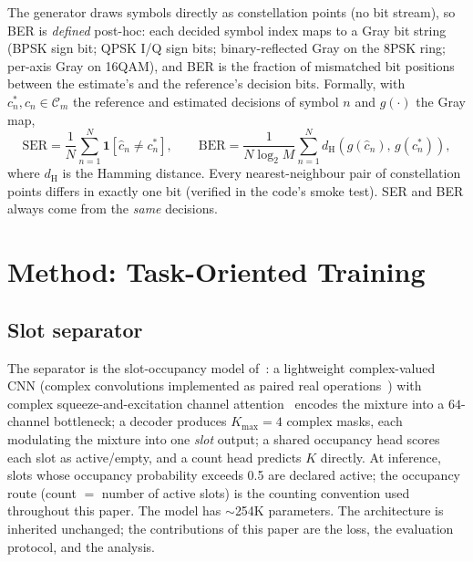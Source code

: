 \documentclass[review,12pt]{elsarticle}
\begin{document}
The generator draws symbols directly as constellation points (no bit
stream), so BER is \emph{defined} post-hoc: each decided symbol index
maps to a Gray bit string (BPSK sign bit; QPSK I/Q sign bits;
binary-reflected Gray on the 8PSK ring; per-axis Gray on 16QAM), and
BER is the fraction of mismatched bit positions between the estimate's
and the reference's decision bits. Formally, with
$c_n^{*}, \hat{c}_n \in \mathcal{C}_m$ the reference and estimated
decisions of symbol $n$ and $g(\cdot)$ the Gray map,
\begin{equation}
  \mathrm{SER} = \frac{1}{N} \sum_{n=1}^{N}
  \mathbf{1}\!\left[\hat{c}_n \neq c_n^{*}\right],
  \qquad
  \mathrm{BER} = \frac{1}{N \log_2 M} \sum_{n=1}^{N}
  d_{\mathrm{H}}\!\left(g(\hat{c}_n),\, g(c_n^{*})\right),
  \label{eq:serber}
\end{equation}
where $d_{\mathrm{H}}$ is the Hamming distance.
Every nearest-neighbour pair of
constellation points differs in exactly one bit (verified in the code's
smoke test). SER and BER always come from the \emph{same} decisions.

\section{Method: Task-Oriented Training}
\label{sec:method}

\subsection{Slot separator}
\label{sec:arch}

The separator is the slot-occupancy model of~\cite{nong2026openworld}:
a lightweight complex-valued CNN (complex convolutions implemented as
paired real operations~\cite{trabelsi2018complex}) with complex
squeeze-and-excitation channel attention~\cite{hu2018senet} encodes the
mixture into a $64$-channel bottleneck; a decoder produces $K_{\max}=4$
complex masks, each modulating the mixture into one \emph{slot} output;
a shared occupancy head scores each slot as active/empty, and a count
head predicts $K$ directly. At inference, slots whose occupancy
probability exceeds 0.5 are declared active; the occupancy route (count
$=$ number of active slots) is the counting convention used throughout
this paper. The model has $\sim$254K parameters. The architecture is
inherited unchanged; the contributions of this paper are the loss, the
evaluation protocol, and the analysis.
\end{document}
